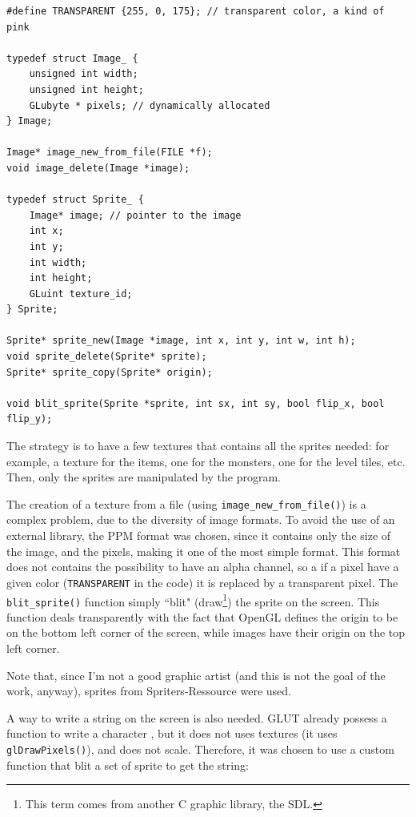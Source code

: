 \documentclass[12pt,a4paper]{article}
\newcommand{\cc}[1]{\texttt{#1}}
\begin{document}
\begin{verbatim}
#define TRANSPARENT {255, 0, 175}; // transparent color, a kind of pink

typedef struct Image_ {
	unsigned int width;
	unsigned int height;
	GLubyte * pixels; // dynamically allocated
} Image;

Image* image_new_from_file(FILE *f);
void image_delete(Image *image);

typedef struct Sprite_ {
	Image* image; // pointer to the image
	int x;
	int y;
	int width;
	int height;
	GLuint texture_id;
} Sprite;

Sprite* sprite_new(Image *image, int x, int y, int w, int h);
void sprite_delete(Sprite* sprite);
Sprite* sprite_copy(Sprite* origin);

void blit_sprite(Sprite *sprite, int sx, int sy, bool flip_x, bool flip_y);
\end{verbatim}

The strategy is to have a few textures that contains all the sprites needed: for example, a texture for the items, one for the monsters, one for the level tiles, etc. Then, only the sprites are manipulated by the program.

The creation of a texture from a file (using \cc{image_new_from_file()}) is a complex problem, due to the diversity of image formats. To avoid the use of an external library, the PPM format \cite{ppmformat} was chosen, since it contains only the size of the image, and the pixels, making it one of the most simple format. This format does not contains the possibility to have an alpha channel, so a if a pixel have a given color (\cc{TRANSPARENT} in the code) it is replaced by a transparent pixel. The \cc{blit_sprite()} function simply ``blit" (draw\footnote{This term comes from another C graphic library, the SDL.}) the sprite on the screen. This function deals transparently with the fact that OpenGL defines the origin to be on the bottom left corner of the screen, while images have their origin on the top left corner. 

Note that, since I'm not a good graphic artist (and this is not the goal of the work, anyway), sprites from Spriters-Ressource \cite{spriters} were used.

A way to write a string on the screen is also needed. GLUT already possess a function to write a character \cite{glutrefchar}, but it does not uses textures (it uses \cc{glDrawPixels()}), and does not scale. Therefore, it was chosen to use a custom function that blit a set of sprite to get the string:
\end{document}
